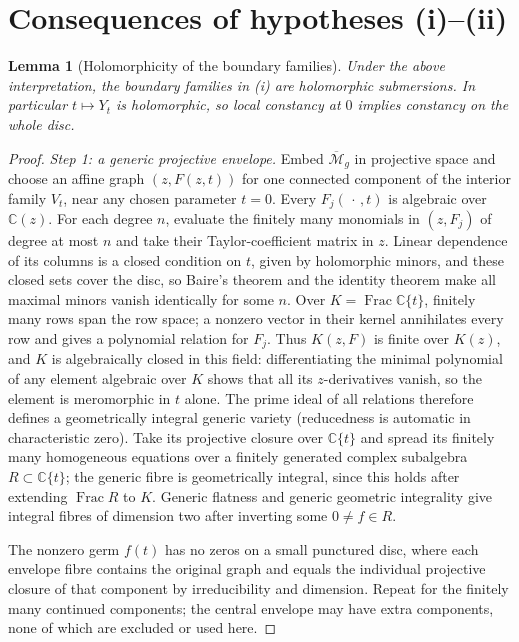 \documentclass[11pt]{article}
\newcommand{\M}{\mathcal M}
\newcommand{\cl}[1]{\overline{#1}}
\newtheorem{lemma}[theorem]{Lemma}
\theoremstyle{remark}
\begin{document}
\section{Consequences of hypotheses (i)--(ii)}\label{sec:hyp}

\begin{lemma}[Holomorphicity of the boundary families]\label{lem:regularity}
Under the above interpretation, the boundary families in (i)
are holomorphic submersions. In particular \(t\mapsto Y_t\)
is holomorphic, so local constancy at \(0\) implies constancy
on the whole disc.
\end{lemma}
\begin{proof}
\emph{Step 1: a generic projective envelope.}
Embed \(\cl{\M}_g\) in projective space and choose an affine graph
\((z,F(z,t))\) for one connected component of the interior
family \(V_t\), near any chosen parameter \(t=0\).
Every \(F_j(\,\cdot\,,t)\) is algebraic over \(\mathbb C(z)\).
For each degree \(n\), evaluate the finitely many monomials
in \((z,F_j)\) of degree at most \(n\) and take their
Taylor-coefficient matrix in \(z\).
Linear dependence of its columns is a closed condition on
\(t\), given by holomorphic minors, and these closed sets cover
the disc, so Baire's theorem and the identity theorem make all
maximal minors vanish identically for some \(n\).
Over \(K=\operatorname{Frac}\mathbb C\{t\}\), finitely many
rows span the row space; a nonzero vector in their kernel
annihilates every row and gives a polynomial relation for \(F_j\).
Thus \(K(z,F)\) is finite over \(K(z)\), and
\(K\) is algebraically closed in this field:
differentiating the minimal polynomial of any element
algebraic over \(K\) shows that all its \(z\)-derivatives
vanish, so the element is meromorphic in \(t\) alone.
The prime ideal of all relations therefore defines a
geometrically integral generic variety \cite[Tag 037P]{Stacks}
(reducedness is automatic in characteristic zero).
Take its
projective closure over \(\mathbb C\{t\}\) and spread its finitely
many homogeneous equations over a finitely generated complex
subalgebra \(R\subset\mathbb C\{t\}\); the generic fibre
is geometrically integral, since this holds after extending
\(\operatorname{Frac}R\) to \(K\). Generic flatness and
generic geometric integrality
\cite[Tags 052A, 0559, 0578]{Stacks} give integral fibres
of dimension two after inverting some \(0\ne f\in R\).

The nonzero germ \(f(t)\) has no zeros on a small punctured disc,
where each envelope fibre contains the original graph and equals
the individual projective closure of that component by
irreducibility and dimension. Repeat for the finitely many continued components;
the central envelope may have extra components, none of which are
excluded or used here.


\end{proof}
\end{document}
